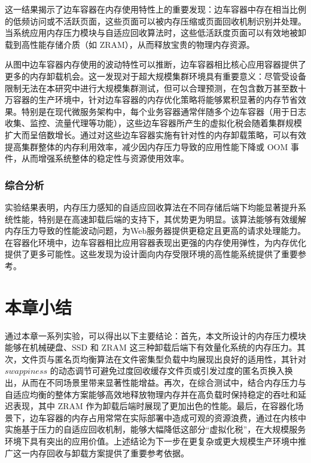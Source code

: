这一结果揭示了边车容器在内存使用特性上的重要发现：边车容器中存在相当比例的低频访问或不活跃页面，这些页面可以被内存压缩或页面回收机制识别并处理。当系统应用内存压力模块与自适应回收算法时，这些低活跃度页面可以有效地被卸载到高性能存储介质（如 ZRAM），从而释放宝贵的物理内存资源。

从图中边车容器内存使用的波动特性可以推断，边车容器相比核心应用容器提供了更多的内存卸载机会。这一发现对于超大规模集群环境具有重要意义：尽管受设备限制无法在本研究中进行大规模集群测试，但可以合理预测，在包含数万甚至数十万容器的生产环境中，针对边车容器的内存优化策略将能够累积显著的内存节省效果。特别是在现代微服务架构中，每个业务容器通常伴随多个边车容器（用于日志收集、监控、流量代理等功能），这些边车容器所产生的虚拟化税会随着集群规模扩大而呈倍数增长。通过对这些边车容器实施有针对性的内存卸载策略，可以有效提高集群整体的内存利用效率，减少因内存压力导致的应用性能下降或 OOM 事件，从而增强系统整体的稳定性与资源使用效率。

\subsubsection{综合分析}
实验结果表明，内存压力感知的自适应回收算法在不同存储后端下均能显著提升系统性能，特别是在高速卸载后端的支持下，其优势更为明显。该算法能够有效缓解内存压力导致的性能波动问题，为Web服务器提供更稳定且更高的请求处理能力。在容器化环境中，边车容器相比应用容器表现出更强的内存使用弹性，为内存优化提供了更多可能性。这些发现为设计面向内存受限环境的高性能系统提供了重要参考。


\section{本章小结}

通过本章一系列实验，可以得出以下主要结论：首先，本文所设计的内存压力模块能够在机械硬盘、SSD 和 ZRAM 这三种卸载后端下有效量化系统的内存压力。其次，文件页与匿名页均衡算法在文件密集型负载中均展现出良好的适用性，其针对 \(swappiness\)  的动态调节可避免过度回收缓存文件页或引发过度的匿名页换入换出，从而在不同场景里带来显著性能增益。再次，在综合测试中，结合内存压力与自适应均衡的整体方案能够高效地释放物理内存并在高负载时保持稳定的吞吐和延迟表现，其中 ZRAM 作为卸载后端时展现了更加出色的性能。最后，在容器化场景下，边车容器的内存占用常常在实际部署中造成可观的资源浪费，通过在内核中实施基于压力的自适应回收机制，能够大幅降低这部分“虚拟化税”，在大规模服务环境下具有突出的应用价值。上述结论为下一步在更复杂或更大规模生产环境中推广这一内存回收与卸载方案提供了重要参考依据。
